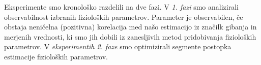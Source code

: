 Eksperimente smo kronološko razdelili na dve fazi. V \emph{1. fazi} smo analizirali observabilnost izbranih fizioloških parametrov. Parameter je observabilen, če obstaja neničelna (pozitivna) korelacija med našo estimacijo iz značilk gibanja in merjenih vrednosti, ki smo jih dobili iz zanesljivih metod pridobivanja fizioloških parametrov. %
V \emph{eksperimentih 2. faze} smo optimizirali segmente postopka estimacije fizioloških parametrov. %

\renewcommand{\folder}{./pogl/03-eksperimenti}


